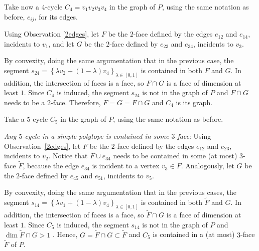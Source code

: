 \documentclass[11pt]{amsart}
\theoremstyle{definition}
\begin{document}
Take now a $4$-cycle $C_4=v_1v_2v_3v_4$ in the graph of $P$, using the same notation as before, $e_{ij}$, for its edges.

Using Observation \ref{2edges}, let $F$ be the $2$-face defined by the edges $e_{12}$ and $e_{14}$, incidents to $v_1$, and let $G$ be the $2$-face defined by $e_{23}$ and $e_{34}$, incidents to $v_3$.

By convexity, doing the same argumentation that in the previous case, the segment $s_{24}=\left\{\lambda v_2 + (1-\lambda) v_4\right\}_{\lambda\in[0,1]}$ is contained in both $F$ and $G$. In addition, the intersection of faces is a face, so $F\cap G$ is a face of dimension at least $1$. Since $C_4$ is induced, the segment $s_{24}$ is not in the graph of $P$ and $F\cap G$ needs to be a $2$-face. Therefore, $F=G=F\cap G$ and $C_4$ is its graph.
\bigskip

Take a $5$-cycle $C_5$ in the graph of $P$, using the same notation as before.

% 
% 

\emph{Any $5$-cycle in a simple polytope is contained in some $3$-face}:
Using Observation~\ref{2edges}, let $F$ be the $2$-face defined by the edges $e_{12}$ and $e_{23}$, incidents to $v_2$. Notice that $F \cup e_{34}$ needs to be contained in some (at most) $3$-face $\tilde{F}$, because the edge $e_{34}$ is incident to a vertex $v_3\in F$. Analogously, let $G$ be the $2$-face defined by $e_{45}$ and $e_{51}$, incidents to $v_5$.

By convexity, doing the same argumentation that in the previous cases, the segment $s_{14}=\left\{\lambda v_1 + (1-\lambda) v_4\right\}_{\lambda\in[0,1]}$ is contained in both $\tilde{F}$ and $G$. In addition, the intersection of faces is a face, so $\tilde{F}\cap G$ is a face of dimension at least $1$. Since $C_5$ is induced, the segment $s_{14}$ is not in the graph of $P$ and $\dim \tilde{F}\cap G > 1$ . Hence, $G=\tilde{F}\cap G\subset \tilde{F}$ and $C_5$ is contained in a (at most) $3$-face $\tilde{F}$ of $P$. 
\bigskip
\end{document}
